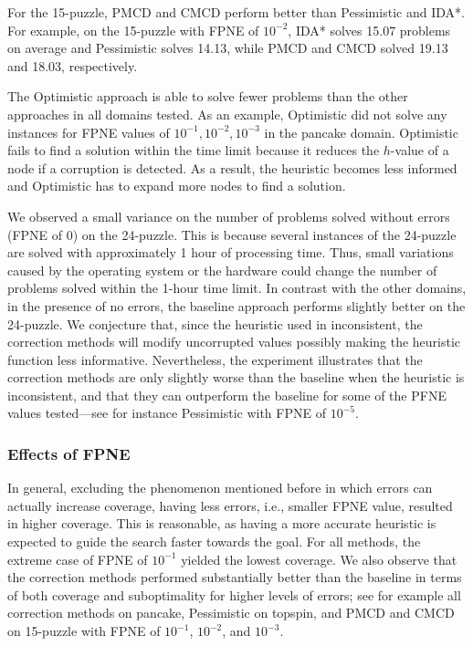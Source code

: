 \documentclass[letterpaper]{article}
\begin{document}
For the 15-puzzle, PMCD and CMCD perform better than Pessimistic and IDA*. For example, on the 15-puzzle with FPNE of $10^{-2}$, IDA* solves 15.07 problems on average and Pessimistic solves 14.13, while PMCD and CMCD solved 19.13 and 18.03, respectively. 

The Optimistic approach is able to solve fewer problems than the other approaches in all domains tested. As an example, Optimistic did not solve any instances for FPNE values of $10^{-1}, 10^{-2}, 10^{-3}$ in the pancake domain. Optimistic fails to find a solution within the time limit because it reduces the $h$-value of a node if a corruption is detected. As a result, the heuristic becomes less informed and Optimistic has to expand more nodes 
to find a solution. 

We observed a small variance on the number of problems solved without errors (FPNE of $0$) on the 24-puzzle. %
This is because several instances of the 24-puzzle are solved with approximately 1 hour of processing time. Thus, small variations caused by the operating system or the hardware could change the number of problems solved within the 1-hour time limit. In contrast with the other domains, in the presence of no errors, the baseline approach performs slightly better on the 24-puzzle. We conjecture that, since the heuristic used in inconsistent, the correction methods will modify uncorrupted values possibly making the heuristic function less informative. Nevertheless, the experiment illustrates that the correction methods are only slightly worse than the baseline when the heuristic is inconsistent, and that they can outperform the baseline for some of the PFNE values tested---see for instance Pessimistic with FPNE of $10^{-5}$. 

\subsubsection{Effects of FPNE} 
In general, excluding the phenomenon mentioned before in which errors can actually increase coverage, having less errors, i.e., smaller FPNE value, resulted in higher coverage. This is reasonable, as having a more accurate heuristic is expected to guide the search faster towards the goal. For all methods, the extreme case of FPNE of $10^{-1}$ yielded the lowest coverage. We also observe that the correction methods performed substantially better than the baseline in terms of both coverage and suboptimality for higher levels of errors; see for example all correction methods on pancake, Pessimistic on topspin, and PMCD and CMCD on 15-puzzle with FPNE of $10^{-1}$, $10^{-2}$, and $10^{-3}$. 
\end{document}

